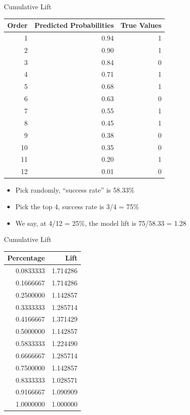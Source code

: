 \documentclass[
  ignorenonframetext,
]{beamer}
\providecommand{\tightlist}{%
  \setlength{\itemsep}{0pt}\setlength{\parskip}{0pt}}
\begin{document}
\begin{frame}{Cumulative Lift}
\protect\hypertarget{cumulative-lift-6}{}

\begin{longtable}[]{@{}rrr@{}}
\toprule
Order & Predicted Probabilities & True Values\tabularnewline
\midrule
\endhead
1 & 0.94 & 1\tabularnewline
2 & 0.90 & 1\tabularnewline
3 & 0.84 & 0\tabularnewline
4 & 0.71 & 1\tabularnewline
5 & 0.68 & 1\tabularnewline
6 & 0.63 & 0\tabularnewline
7 & 0.55 & 1\tabularnewline
8 & 0.45 & 1\tabularnewline
9 & 0.38 & 0\tabularnewline
10 & 0.35 & 0\tabularnewline
11 & 0.20 & 1\tabularnewline
12 & 0.01 & 0\tabularnewline
\bottomrule
\end{longtable}

\begin{itemize}
\tightlist
\item
  Pick randomly, ``success rate'' is 58.33\%
\item
  Pick the top 4, success rate is 3/4 = 75\%
\item
  We say, at 4/12 = 25\%, the model lift is 75/58.33 = 1.28
\end{itemize}

\end{frame}

\begin{frame}{Cumulative Lift}
\protect\hypertarget{cumulative-lift-7}{}

\begin{longtable}[]{@{}rr@{}}
\toprule
Percentage & Lift\tabularnewline
\midrule
\endhead
0.0833333 & 1.714286\tabularnewline
0.1666667 & 1.714286\tabularnewline
0.2500000 & 1.142857\tabularnewline
0.3333333 & 1.285714\tabularnewline
0.4166667 & 1.371429\tabularnewline
0.5000000 & 1.142857\tabularnewline
0.5833333 & 1.224490\tabularnewline
0.6666667 & 1.285714\tabularnewline
0.7500000 & 1.142857\tabularnewline
0.8333333 & 1.028571\tabularnewline
0.9166667 & 1.090909\tabularnewline
1.0000000 & 1.000000\tabularnewline
\bottomrule
\end{longtable}

\end{frame}
\end{document}
